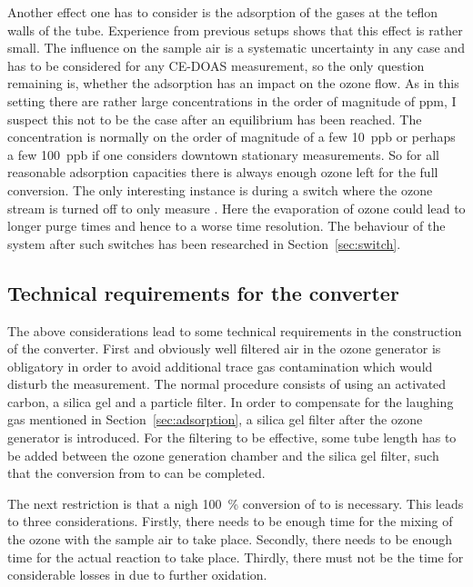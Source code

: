 Another effect one has to consider is the adsorption of the gases at
the teflon walls of the tube. Experience from previous setups shows
that this effect is rather small. The influence on the sample air is a
systematic uncertainty in any case and has to be considered for any
CE-DOAS measurement, so the only question remaining is, whether the
adsorption has an impact on the ozone flow. As in this setting there
are rather large concentrations in the order of magnitude of \si{ppm},
I suspect this not to be the case after an equilibrium has been
reached. The  concentration is normally on the order of
magnitude of a few \SI{10}{ppb} or perhaps a few \SI{100}{ppb} if one
considers downtown stationary measurements. So for all reasonable
adsorption capacities there is always enough ozone left for the full
conversion. The only interesting instance is during a switch where the
ozone stream is turned off to only measure . Here the
evaporation of ozone could lead to longer purge times and hence to a
worse time resolution. The behaviour of the system after such switches
has been researched in Section~\ref{sec:switch}.

\subsection{Technical requirements for the converter}
\label{sec:requirements}

The above considerations lead to some technical requirements in the
construction of the converter. First and obviously well filtered air
in the ozone generator is obligatory in order to avoid additional
trace gas contamination which would disturb the measurement. The
normal procedure consists of using an activated carbon, a silica gel
and a particle filter. In order to compensate for the laughing gas mentioned in
Section~\ref{sec:adsorption}, a silica gel filter after the ozone
generator is introduced. For the filtering to be effective, some tube
length has to be added between the ozone generation chamber and the
silica gel filter, such that the conversion from  to 
can be completed.

The next restriction is that a nigh \SI{100}{\%} conversion of 
to  is necessary. This leads to three considerations. Firstly,
there needs to be enough time for the mixing of the ozone with the
sample air to take place. Secondly, there needs to be enough time for
the actual reaction to take place. Thirdly, there must not be the time 
for considerable losses in  due to further oxidation.

